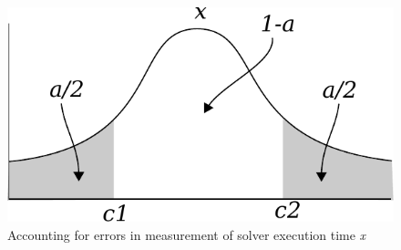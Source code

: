 \begin{figure}
\centering
\includegraphics[width=0.6\linewidth]{Figures/confidence}
\caption[Accounting for errors in measurement of solver execution time \textit{x}]{Accounting for errors in measurement of solver execution time \textit{x}}
\label{fig:confidence}
\end{figure}


%
%

